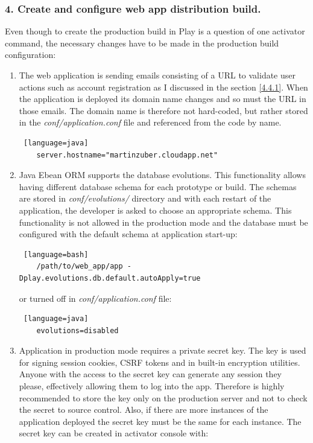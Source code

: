 \documentclass[12pt,twoside,a4paper]{report}
\begin{document}
\subsubsection{4. Create and configure web app distribution build.}
Even though to create the production build in Play is a question of one activator command, the necessary changes have to be made in the production build configuration:
\begin{enumerate}\itemsep1pt \parskip0pt 
\item The web application is sending emails consisting of a URL to validate user actions such as account registration as I discussed in the section \ref{4.4.1}. When the application is deployed its domain name changes and so must the URL in those emails. The domain name is therefore not hard-coded, but rather stored in the \emph{conf/application.conf} file and referenced from the code by name.
\begin{lstlisting} [language=java]
	server.hostname="martinzuber.cloudapp.net"
\end{lstlisting} 
\item Java Ebean ORM supports the database evolutions. This functionality allows having different database schema for each prototype or build. The schemas are stored in \emph{conf/evolutions/} directory and with each restart of the application, the developer is asked to choose an appropriate schema. This functionality is not allowed in the production mode and the database must be configured with the default schema at application start-up:
\begin{lstlisting} [language=bash]
	/path/to/web_app/app -Dplay.evolutions.db.default.autoApply=true
\end{lstlisting} 
or turned off in \emph{conf/application.conf} file:
\begin{lstlisting} [language=java]
	evolutions=disabled
\end{lstlisting} 
\item Application in production mode requires a private secret key. The key is used for signing session cookies, CSRF tokens and in built-in encryption utilities. Anyone with the access to the secret key can generate any session they please, effectively allowing them to log into the app. Therefore is highly recommended to store the key only on the production server and not to check the secret to source control. Also, if there are more instances of the application deployed the secret key must be the same for each instance. The secret key can be created in activator console with:

\end{enumerate}
\end{document}
